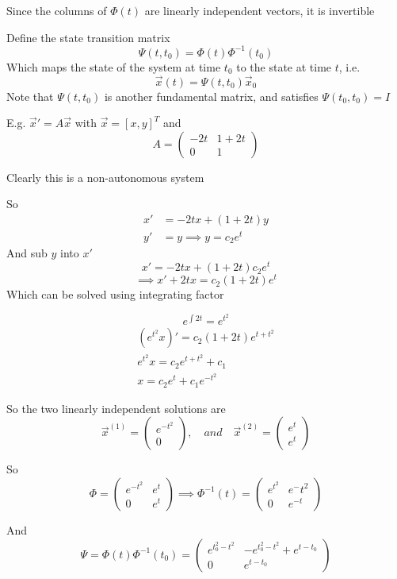 \documentclass{X:/Documents/Coding/Latex/myassignment}
\begin{document}
Since the columns of $\Phi(t)$ are linearly independent vectors, it is invertible 

Define the state transition matrix 
\[\Psi(t,t_0) = \Phi(t) \Phi^{-1}(t_0)\]
Which maps the state of the system at time $t_0$ to the state at time $t$, i.e. 
\[\vec x(t) = \Psi(t,t_0) \vec x_0\]
Note that $\Psi(t,t_0)$ is another fundamental matrix, and satisfies $\Psi(t_0,t_0) = I$

E.g. $\vec x' = A \vec x$ with $\vec x = \left[x,y\right]^T$ and 
\[A = \begin{pmatrix}
    -2t&1+2t\\0&1
\end{pmatrix}\]

Clearly this is a non-autonomous system


So
\begin{align*}
    x' &= -2tx + (1+2t)y\\
    y' &= y \implies y = c_2 e^t
\end{align*}
And sub $y$ into $x'$
\[x' = -2tx + (1+2t)c_2 e^t\]
\[\implies x' + 2tx = c_2(1+2t)e^t\]
Which can be solved using integrating factor

\[e^{\int 2t} = e^{t^2}\]
\begin{align*}
    (e^{t^2} x)' = c_2 (1+2t)e^{t+t^2}\\
    e^{t^2} x = c_2 e^{t+t^2} + c_1\\
    x = c_2 e^{t} + c_1 e^{-t^2}    
\end{align*}

So the two linearly independent solutions are
\[\vec x^{(1)} = \begin{pmatrix}
    e^{-t^2}\\0
\end{pmatrix}, \quad and \quad \vec x^{(2)} = \begin{pmatrix}
    e^{t}\\e^t
\end{pmatrix}\]

So
\[\Phi = \begin{pmatrix}
    e^{-t^2} & e^t\\ 0 & e^t
\end{pmatrix} \implies \Phi^{-1}(t) = \begin{pmatrix}
    e^{t^2} & e{^-t^2}\\0 & e^{-t}
\end{pmatrix}\]

And
\[\Psi = \Phi(t) \Phi^{-1}(t_0) = \begin{pmatrix}
    e^{t_0^2 - t^2} & -e^{t_0^2 - t^2} + e^{t-t_0}\\
    0 & e^{t-t_0}
\end{pmatrix}\]
\end{document}
